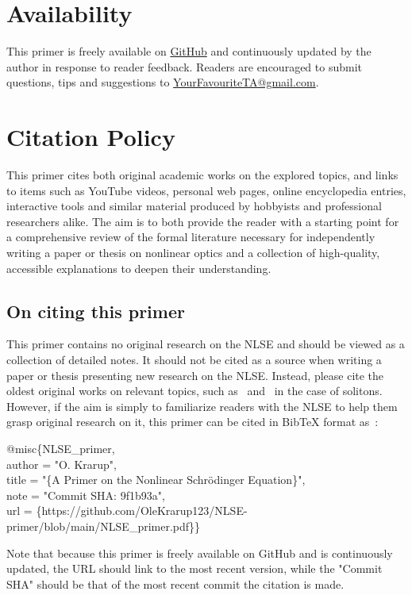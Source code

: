 \section{Availability}
This primer is freely available on \href{https://github.com/OleKrarup123/NLSE-primer}{GitHub} and continuously updated by the author in response to reader feedback. Readers are encouraged to submit questions, tips and suggestions to \href{yourfavouriteta@gmail.com}{YourFavouriteTA@gmail.com}. 


\section{Citation Policy}
This primer cites both original academic works on the explored topics, and links to items such as YouTube videos, personal web pages, online encyclopedia entries, interactive tools and similar material produced by hobbyists and professional researchers alike. The aim is to both provide the reader with a starting point for a comprehensive review of the formal literature necessary for independently writing a paper or thesis on nonlinear optics and a collection of high-quality, accessible explanations to deepen their understanding. 

\subsection{On citing this primer}
This primer contains no original research on the NLSE and should be viewed as a collection of detailed notes. It should not be cited as a source when writing a paper or thesis presenting new research on the NLSE. Instead, please cite the oldest original works on relevant topics, such as~\cite{soliton_first_theory} and~\cite{Soliton_experimental_first} in the case of solitons. However, if the aim is simply to familiarize readers with the NLSE to help them grasp original research on it, this primer can be cited in BibTeX format as~\cite{NLSE_primer}:\\
\begin{boxA}
@misc\{NLSE\_primer,  \\
author = "O. Krarup", \\
title = "\{A Primer on the Nonlinear Schrödinger Equation\}", \\
note = "Commit SHA: 9f1b93a", \\
url = \{https://github.com/OleKrarup123/NLSE-primer/blob/main/NLSE\_primer.pdf\}\}
\end{boxA}

Note that because this primer is freely available on GitHub and is continuously updated, the URL should link to the most recent version, while the "Commit SHA" should be that of the most recent commit the citation is made.     